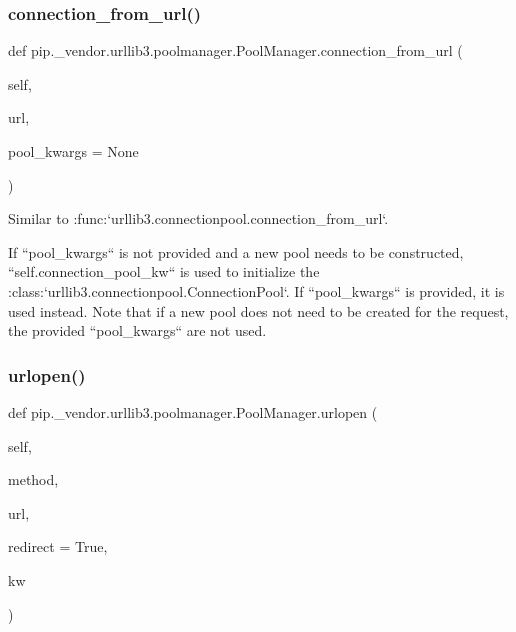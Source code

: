 \subsubsection{\texorpdfstring{connection\+\_\+from\+\_\+url()}{connection\_from\_url()}}
{\footnotesize\ttfamily def pip.\+\_\+vendor.\+urllib3.\+poolmanager.\+Pool\+Manager.\+connection\+\_\+from\+\_\+url (\begin{DoxyParamCaption}\item[{}]{self,  }\item[{}]{url,  }\item[{}]{pool\+\_\+kwargs = {\ttfamily None} }\end{DoxyParamCaption})}

\begin{DoxyVerb}Similar to :func:`urllib3.connectionpool.connection_from_url`.

If ``pool_kwargs`` is not provided and a new pool needs to be
constructed, ``self.connection_pool_kw`` is used to initialize
the :class:`urllib3.connectionpool.ConnectionPool`. If ``pool_kwargs``
is provided, it is used instead. Note that if a new pool does not
need to be created for the request, the provided ``pool_kwargs`` are
not used.
\end{DoxyVerb}
 \mbox{\label{classpip_1_1__vendor_1_1urllib3_1_1poolmanager_1_1PoolManager_a544250cb00f6ef92d7a724790391a985}} 
\subsubsection{\texorpdfstring{urlopen()}{urlopen()}}
{\footnotesize\ttfamily def pip.\+\_\+vendor.\+urllib3.\+poolmanager.\+Pool\+Manager.\+urlopen (\begin{DoxyParamCaption}\item[{}]{self,  }\item[{}]{method,  }\item[{}]{url,  }\item[{}]{redirect = {\ttfamily True},  }\item[{}]{kw }\end{DoxyParamCaption})}

